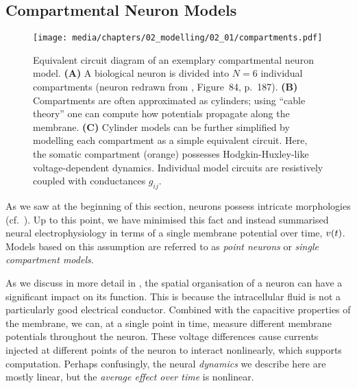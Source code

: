 \subsection{Compartmental Neuron Models}
\label{sec:comp}

\begin{figure}
	\centering
	\texttt{[image: media/chapters/02\_modelling/02\_01/compartments.pdf]}
	{\label{fig:compartments_physical}}%
	{\label{fig:compartments_volumes}}%
	{\label{fig:compartments_circuit}}%
	\caption[Equivalent circuit of an exemplary compartmental neuron model]{Equivalent circuit diagram of an exemplary compartmental neuron model. \textbf{(A)} A biological neuron is divided into $N = 6$ individual compartments (neuron redrawn from \cite{howell1916textbook}, Figure~84, p.~187).
	\textbf{(B)} Compartments are often approximated as cylinders; using \enquote{cable theory} one can compute how potentials propagate along the membrane.
	\textbf{(C)} Cylinder models can be further simplified by modelling each compartment as a simple equivalent circuit. Here, the somatic compartment (orange) possesses Hodgkin-Huxley-like voltage-dependent dynamics. Individual model circuits are resistively coupled with conductances $g_{ij}$.
	}
	\label{fig:compartments}
\end{figure}

As we saw at the beginning of this section, neurons possess intricate morphologies (cf.~).
Up to this point, we have minimised this fact and instead summarised neural electrophysiology in terms of a single membrane potential over time, ${v}(t)$.
Models based on this assumption are referred to as \emph{point neurons} or \emph{single compartment models}.

As we discuss in more detail in , the spatial organisation of a neuron can have a significant impact on its function.
This is because the intracellular fluid is not a particularly good electrical conductor.
Combined with the capacitive properties of the membrane, we can, at a single point in time, measure different membrane potentials throughout the neuron.
These voltage differences cause currents injected at different points of the neuron to interact nonlinearly, which supports computation.
Perhaps confusingly, the neural \emph{dynamics} we describe here are mostly linear, but the \emph{average effect over time} is nonlinear.

